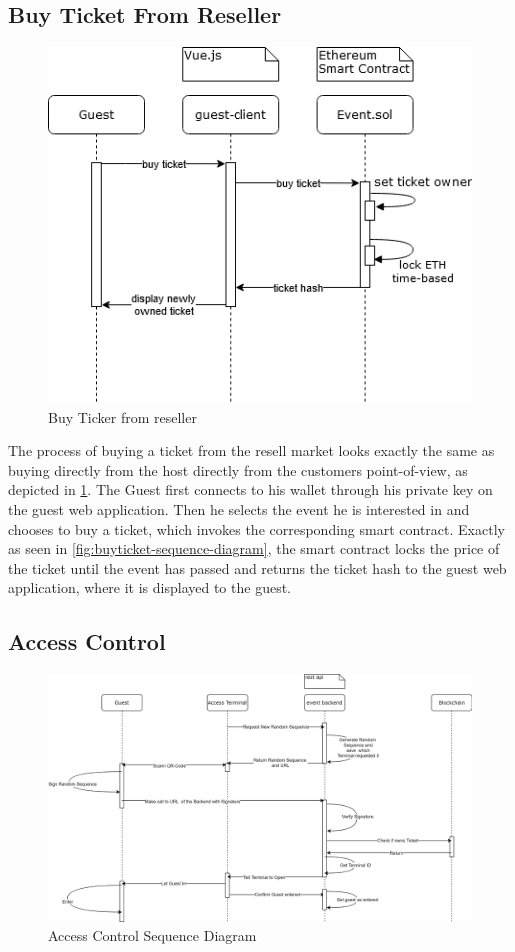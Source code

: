 \subsection{Buy Ticket From Reseller}
\begin{figure}[H]
    \centering
    \includegraphics[width=12cm]{design/diagrams/BuyTicketFromResell.png}
    \caption{Buy Ticker from reseller}
    \label{fig:buyFromResell}
\end{figure}
The process of buying a ticket from the resell market looks exactly the same as buying directly from the host directly from the customers point-of-view, as depicted in \ref{fig:buyFromResell}. The Guest first connects to his wallet through his private key on the guest web application. Then he selects the event he is interested in and chooses to buy a ticket, which invokes the corresponding smart contract. Exactly as seen in \ref{fig:buyticket-sequence-diagram}, the smart contract locks the price of the ticket until the event has passed and returns the ticket hash to the guest web application, where it is displayed to the guest.

\subsection{Access Control}

\begin{figure}[H]
    \centering
    \includegraphics[width=14cm]{design/diagrams/AcessControl.png}
    \caption{Access Control Sequence Diagram}
    \label{fig:access-controll}
\end{figure}


